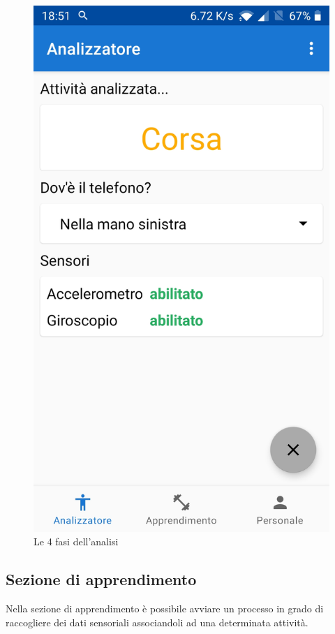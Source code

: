 \begin{figure}[H]
    \includegraphics[scale = 0.10]{assets/images/screenshots/1d_Prediction.jpg}
    \caption{Le 4 fasi dell'analisi}
    \label{fig:screenshots_analysis}
\end{figure}


\subsection{Sezione di apprendimento}
Nella sezione di apprendimento è possibile avviare un processo in grado di raccogliere dei dati sensoriali associandoli ad una
determinata attività. 

